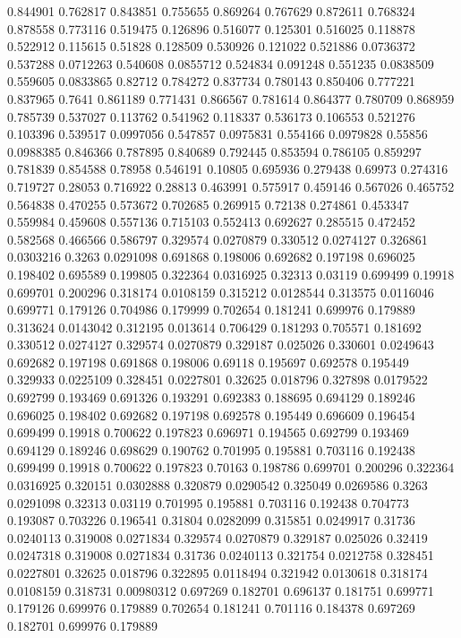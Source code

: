 0.844901 0.762817
0.843851 0.755655
0.869264 0.767629
0.872611 0.768324
0.878558 0.773116
0.519475 0.126896
0.516077 0.125301
0.516025 0.118878
0.522912 0.115615
0.51828 0.128509
0.530926 0.121022
0.521886 0.0736372
0.537288 0.0712263
0.540608 0.0855712
0.524834 0.091248
0.551235 0.0838509
0.559605 0.0833865
0.82712 0.784272
0.837734 0.780143
0.850406 0.777221
0.837965 0.7641
0.861189 0.771431
0.866567 0.781614
0.864377 0.780709
0.868959 0.785739
0.537027 0.113762
0.541962 0.118337
0.536173 0.106553
0.521276 0.103396
0.539517 0.0997056
0.547857 0.0975831
0.554166 0.0979828
0.55856 0.0988385
0.846366 0.787895
0.840689 0.792445
0.853594 0.786105
0.859297 0.781839
0.854588 0.78958
0.546191 0.10805
0.695936 0.279438
0.69973 0.274316
0.719727 0.28053
0.716922 0.28813
0.463991 0.575917
0.459146 0.567026
0.465752 0.564838
0.470255 0.573672
0.702685 0.269915
0.72138 0.274861
0.453347 0.559984
0.459608 0.557136
0.715103 0.552413
0.692627 0.285515
0.472452 0.582568
0.466566 0.586797
0.329574 0.0270879
0.330512 0.0274127
0.326861 0.0303216
0.3263 0.0291098
0.691868 0.198006
0.692682 0.197198
0.696025 0.198402
0.695589 0.199805
0.322364 0.0316925
0.32313 0.03119
0.699499 0.19918
0.699701 0.200296
0.318174 0.0108159
0.315212 0.0128544
0.313575 0.0116046
0.699771 0.179126
0.704986 0.179999
0.702654 0.181241
0.699976 0.179889
0.313624 0.0143042
0.312195 0.013614
0.706429 0.181293
0.705571 0.181692
0.330512 0.0274127
0.329574 0.0270879
0.329187 0.025026
0.330601 0.0249643
0.692682 0.197198
0.691868 0.198006
0.69118 0.195697
0.692578 0.195449
0.329933 0.0225109
0.328451 0.0227801
0.32625 0.018796
0.327898 0.0179522
0.692799 0.193469
0.691326 0.193291
0.692383 0.188695
0.694129 0.189246
0.696025 0.198402
0.692682 0.197198
0.692578 0.195449
0.696609 0.196454
0.699499 0.19918
0.700622 0.197823
0.696971 0.194565
0.692799 0.193469
0.694129 0.189246
0.698629 0.190762
0.701995 0.195881
0.703116 0.192438
0.699499 0.19918
0.700622 0.197823
0.70163 0.198786
0.699701 0.200296
0.322364 0.0316925
0.320151 0.0302888
0.320879 0.0290542
0.325049 0.0269586
0.3263 0.0291098
0.32313 0.03119
0.701995 0.195881
0.703116 0.192438
0.704773 0.193087
0.703226 0.196541
0.31804 0.0282099
0.315851 0.0249917
0.31736 0.0240113
0.319008 0.0271834
0.329574 0.0270879
0.329187 0.025026
0.32419 0.0247318
0.319008 0.0271834
0.31736 0.0240113
0.321754 0.0212758
0.328451 0.0227801
0.32625 0.018796
0.322895 0.0118494
0.321942 0.0130618
0.318174 0.0108159
0.318731 0.00980312
0.697269 0.182701
0.696137 0.181751
0.699771 0.179126
0.699976 0.179889
0.702654 0.181241
0.701116 0.184378
0.697269 0.182701
0.699976 0.179889
